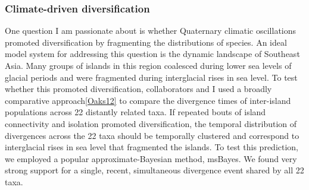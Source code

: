 
\subsubsection*{Climate-driven diversification}
One question I am passionate about is whether Quaternary climatic oscillations
promoted diversification by fragmenting the distributions of species.
An ideal model system for addressing this question is the dynamic landscape of
Southeast Asia.
Many groups of islands in this region coalesced during lower sea levels of
glacial periods and were fragmented during interglacial rises in sea level.
To test whether this promoted diversification, collaborators and I used a
broadly comparative approach\cref{Oaks12} to compare the divergence times
of inter-island populations across 22 distantly related taxa.
If repeated bouts of island connectivity and isolation promoted
diversification, the temporal distribution of divergences across the 22 taxa
should be temporally clustered and correspond to interglacial rises in sea
level that fragmented the islands.
To test this prediction, we employed a popular approximate-Bayesian method,
msBayes.
We found very strong support
for a single, recent, simultaneous divergence event shared by all 22 taxa.

